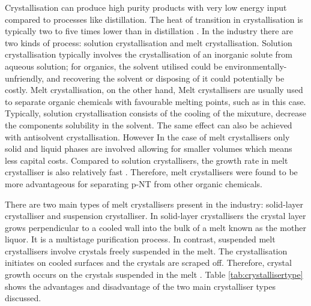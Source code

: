 Crystallisation can produce high purity products with very low energy input compared to processes like distillation. The heat of transition in crystallisation is typically two to five times lower than in distillation \cite{noauthor_melt_nodate}. In the industry there are two kinds of process: solution crystallisation and melt crystallisation. Solution crystallisation typically involves the crystallisation of an inorganic solute from aqueous solution; for organics, the solvent utilised could be environmentally-unfriendly, and recovering the solvent or disposing of it could potentially be costly. Melt crystallisation, on the other hand, Melt crystallisers are usually used to separate organic chemicals with favourable melting points, such as in this case. Typically, solution crystallisation consists of the cooling of the mixuture, decrease the components solubility in the solvent. The same effect can also be achieved with antisolvent crystallisation. However In the case of melt crystallisers only solid and liquid phases are involved allowing for smaller volumes which means less capital costs. Compared to solution crystallisers, the growth rate in melt crystalliser is also relatively fast \cite{myerson_handbook_2019}. Therefore, melt crystallisers were found to be more advantageous for separating p-NT from other organic chemicals. 

There are two main types of melt crystallisers present in the industry: solid-layer crystalliser and suspension crystalliser. In solid-layer crystallisers the crystal layer grows perpendicular to a cooled wall into the bulk of a melt known as the mother liquor. It is a multistage purification process. In contrast, suspended melt crystallisers involve crystals freely suspended in the melt. The crystallisation initiates on cooled surfaces and the crystals are scraped off. Therefore, crystal growth occurs on the crystals suspended in the melt \cite{myerson_handbook_2019}. Table \ref{tab:crystallisertype} shows the advantages and disadvantage of the two main crystalliser types discussed. 

